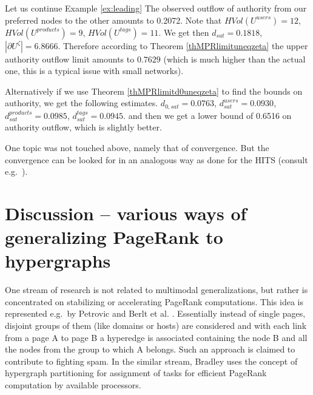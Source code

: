 \documentclass{fundam}
\newcommand{\citep}{\cite}
\newcommand{\Bem}[1]{}
\begin{document}
\begin{example}%
Let us continue Example \ref{ex:leading}
The observed outflow of authority from our preferred nodes to the other amounts to
 0.2072\Bem{91135522084}.
Note that 		 $HVol(U^{users})= 12$,
		  $HVol(U^{products})= 9$,
		  $HVol(U^{tags})= 11$.
We get then $d_{sat}=0.1818\Bem{181818181818}$,
		$|\partial{U^\zeta}| =6.8666\Bem{66666666666}$.
Therefore according to Theorem \ref{thMPRlimituneqzeta} the upper authority outflow limit amounts to
 $0.7629\Bem{62962962963}$ (which is much higher than the actual one, this is a typical issue with small networks).

\medskip
Alternatively  if we use Theorem \ref{thMPRlimitd0uneqzeta} to find the bounds on authority, we get the following estimates.
$ d_{0,sat}=0.0763\Bem{4680134680134}$,
		$d_{sat}^{users}=0.0930\Bem{13468013468}$,
		$d_{sat}^{products}=0.0985\Bem{6902356902356}$,
		$d_{sat}^{ tags}=0.0945\Bem{2861952861952}$.
and then we get a lower bound of  0.6516 on authority outflow, which is slightly better.
\end{example}%

One topic was not touched above, namely that of convergence.
But the convergence can be looked for in an analogous way as done for the HITS (consult e.g.\  \citep[Ch. 11]{LM06}).


\section{Discussion -- various ways of generalizing PageRank to hypergraphs}\label{sec-related}



One stream of research is not related to multimodal generalizations, but rather is concentrated on stabilizing or accelerating PageRank computations.
This idea is represented e.g.\  by  Petrovic \cite{Hyperpagerank} and
Berlt et al. \cite{Berlt:2010}.
Essentially instead of single pages, disjoint groups of them
(like domains or hosts) are considered
and with each link from a page A to page B a hyperedge is associated
containing the node B and all the nodes from the group to which A belongs.
Such an approach is claimed to contribute to fighting spam.
In the similar stream, Bradley \cite{Bradley:2005hypergraphpartitioning}
uses the concept of hypergraph partitioning for assignment of tasks for efficient PageRank computation by available processors.
\end{document}
